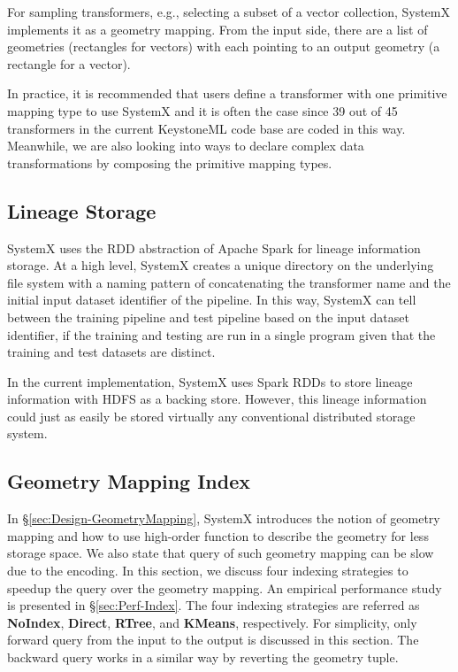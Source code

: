\documentclass{sig-alternate}
\begin{document}
For sampling transformers, e.g., selecting a subset of a vector collection, SystemX implements it as a geometry mapping.
From the input side, there are a list of geometries (rectangles for vectors) with each pointing to an output geometry (a rectangle for a vector).

In practice, it is recommended that users define a transformer with one primitive mapping type to use SystemX and it is often the case since
39 out of 45 transformers in the current KeystoneML code base are coded in this way. 
Meanwhile, we are also looking into ways to declare complex data transformations by composing the primitive mapping types.


\subsection{Lineage Storage}
SystemX uses the RDD abstraction of Apache Spark for lineage information storage. 
At a high level, SystemX creates a unique directory on the underlying file system with a naming pattern of 
concatenating the transformer name and the initial input dataset identifier of the pipeline.
In this way, SystemX can tell between the training pipeline and test pipeline based on the input dataset identifier,
if the training and testing are run in a single program given that the training and test datasets are distinct.

In the current implementation, SystemX uses Spark RDDs to store lineage information with HDFS as a backing store. 
However, this lineage information could just as easily be stored virtually any conventional distributed storage system.


\subsection{Geometry Mapping Index}
\label{sec:GeometryIndex}
In \S\ref{sec:Design-GeometryMapping}, SystemX introduces the notion of geometry mapping and how to use high-order function
to describe the geometry for less storage space. 
We also state that query of such geometry mapping can be slow due to the encoding. 
In this section, we discuss four indexing strategies to speedup the query over the geometry mapping. 
An empirical performance study is presented in \S\ref{sec:Perf-Index}.
The four indexing strategies are referred as {\bf NoIndex}, {\bf Direct}, {\bf RTree}, and {\bf KMeans}, respectively.
For simplicity, only forward query from the input to the output is discussed in this section.
The backward query works in a similar way by reverting the geometry tuple.
\end{document}
